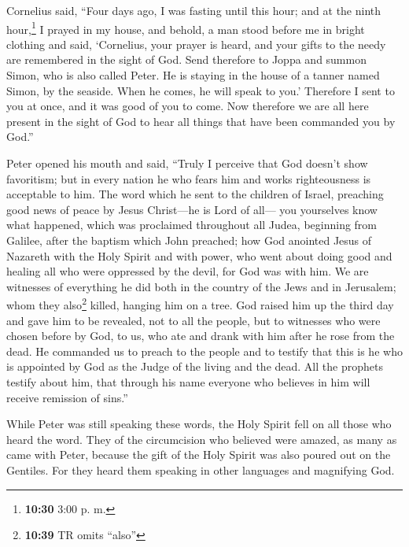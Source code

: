  Cornelius said, ``Four days ago, I was fasting until
this hour; and at the ninth hour,\footnote{\textbf{10:30} 3:00 p. m.} I
prayed in my house, and behold, a man stood before me in bright clothing
 and said, `Cornelius, your prayer is heard, and your
gifts to the needy are remembered in the sight of God. 
Send therefore to Joppa and summon Simon, who is also called Peter. He
is staying in the house of a tanner named Simon, by the seaside. When he
comes, he will speak to you.'  Therefore I sent to you at
once, and it was good of you to come. Now therefore we are all here
present in the sight of God to hear all things that have been commanded
you by God.''

 Peter opened his mouth and said, ``Truly I perceive that
God doesn't show favoritism;  but in every nation he who
fears him and works righteousness is acceptable to him. 
The word which he sent to the children of Israel, preaching good news of
peace by Jesus Christ---he is Lord of all---  you
yourselves know what happened, which was proclaimed throughout all
Judea, beginning from Galilee, after the baptism which John preached;
 how God anointed Jesus of Nazareth with the Holy Spirit
and with power, who went about doing good and healing all who were
oppressed by the devil, for God was with him.  We are
witnesses of everything he did both in the country of the Jews and in
Jerusalem; whom they also\footnote{\textbf{10:39} TR omits ``also''}
killed, hanging him on a tree.  God raised him up the
third day and gave him to be revealed,  not to all the
people, but to witnesses who were chosen before by God, to us, who ate
and drank with him after he rose from the dead.  He
commanded us to preach to the people and to testify that this is he who
is appointed by God as the Judge of the living and the dead.
 All the prophets testify about him, that through his
name everyone who believes in him will receive remission of sins.''

 While Peter was still speaking these words, the Holy
Spirit fell on all those who heard the word.  They of the
circumcision who believed were amazed, as many as came with Peter,
because the gift of the Holy Spirit was also poured out on the Gentiles.
 For they heard them speaking in other languages and
magnifying God.

